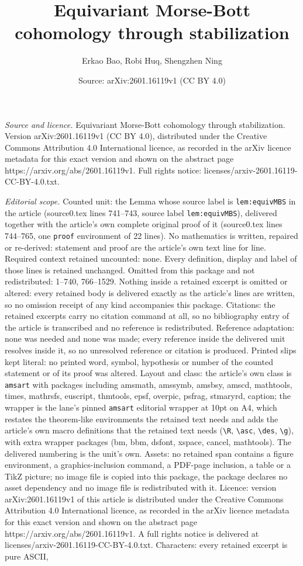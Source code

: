\documentclass[10pt,a4paper]{amsart}
\title[Equivariant Morse-Bott cohomology through stabilization]{Equivariant Morse-Bott cohomology through stabilization}
\author{Erkao Bao, Robi Huq, Shengzhen Ning}
\date{Source: arXiv:2601.16119v1 (CC BY 4.0)}
\begin{document}
\maketitle

\noindent\emph{Source and licence.} Equivariant Morse-Bott cohomology through stabilization. Version arXiv:2601.16119v1 (CC BY 4.0), distributed under the Creative Commons Attribution 4.0 International licence, as recorded in the arXiv licence metadata for this exact version and shown on the abstract page https://arxiv.org/abs/2601.16119v1. Full rights notice: licenses/arxiv-2601.16119-CC-BY-4.0.txt.\par\smallskip

\noindent\textit{Editorial scope.} Counted unit: the Lemma whose source label is \texttt{lem:equivMBS} in the article (source0.tex lines 741--743, source label \texttt{lem:equivMBS}), delivered together with the article's own complete original proof of it (source0.tex lines 744--765, one \texttt{proof} environment of 22 lines). No mathematics is written, repaired or re-derived: statement and proof are the article's own text line for line. Required context retained uncounted: none. Every definition, display and label of those lines is retained unchanged. Omitted from this package and not redistributed: 1--740, 766--1529. Nothing inside a retained excerpt is omitted or altered: every retained body is delivered exactly as the article's lines are written, so no omission receipt of any kind accompanies this package. Citations: the retained excerpts carry no citation command at all, so no bibliography entry of the article is transcribed and no reference is redistributed. Reference adaptation: none was needed and none was made; every reference inside the delivered unit resolves inside it, so no unresolved reference or citation is produced. Printed slips kept literal: no printed word, symbol, hypothesis or number of the counted statement or of its proof was altered. Layout and class: the article's own class is \texttt{amsart} with packages including amsmath, amssymb, amsbsy, amscd, mathtools, times, mathrsfs, euscript, thmtools, epsf, overpic, psfrag, stmaryrd, caption; the wrapper is the lane's pinned \texttt{amsart} editorial wrapper at 10pt on A4, which restates the theorem-like environments the retained text needs and adds the article's own macro definitions that the retained text needs (\texttt{\textbackslash R}, \texttt{\textbackslash asc}, \texttt{\textbackslash des}, \texttt{\textbackslash g}), with extra wrapper packages (bm, bbm, dsfont, xspace, cancel, mathtools). The delivered numbering is the unit's own. Assets: no retained span contains a figure environment, a graphics-inclusion command, a PDF-page inclusion, a table or a TikZ picture; no image file is copied into this package, the package declares no asset dependency and no image file is redistributed with it. Licence: version arXiv:2601.16119v1 of this article is distributed under the Creative Commons Attribution 4.0 International licence, as recorded in the arXiv licence metadata for this exact version and shown on the abstract page https://arxiv.org/abs/2601.16119v1. A full rights notice is delivered at licenses/arxiv-2601.16119-CC-BY-4.0.txt. Characters: every retained excerpt is pure ASCII, 
\end{document}
